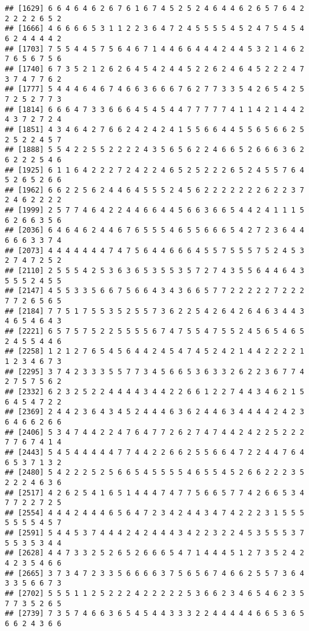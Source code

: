 \documentclass[
]{article}
\begin{document}
\begin{verbatim}
## [1629] 6 6 4 6 4 6 2 6 7 6 1 6 7 4 5 2 5 2 4 6 4 4 6 2 6 5 7 6 4 2 2 2 2 2 6 5 2
## [1666] 4 6 6 6 6 5 3 1 1 2 2 3 6 4 7 2 4 5 5 5 5 4 5 2 4 7 5 4 5 4 6 2 4 4 4 4 2
## [1703] 7 5 5 4 4 5 7 5 6 4 6 7 1 4 4 6 6 4 4 4 2 4 4 5 3 2 1 4 6 2 7 6 5 6 7 5 6
## [1740] 6 7 3 5 2 1 2 6 2 6 4 5 4 2 4 4 5 2 2 6 2 4 6 4 5 2 2 2 4 7 3 7 4 7 7 6 2
## [1777] 5 4 4 4 6 4 6 7 4 6 6 3 6 6 6 7 6 2 7 7 3 3 5 4 2 6 5 4 2 5 7 2 5 2 7 7 3
## [1814] 6 6 6 4 7 3 3 6 6 6 4 5 4 5 4 4 7 7 7 7 7 4 1 1 4 2 1 4 4 2 4 3 7 2 7 2 4
## [1851] 4 3 4 6 4 2 7 6 6 2 4 2 4 2 4 1 5 5 6 6 4 4 5 5 6 5 6 6 2 5 2 5 2 2 4 5 7
## [1888] 5 5 4 2 2 5 5 2 2 2 2 4 3 5 6 5 6 2 2 4 6 6 5 2 6 6 6 3 6 2 6 2 2 2 5 4 6
## [1925] 6 1 1 6 4 2 2 2 7 2 4 2 2 4 6 5 2 5 2 2 2 6 5 2 4 5 5 7 6 4 5 2 6 5 2 6 6
## [1962] 6 6 2 2 5 6 2 4 4 6 4 5 5 5 2 4 5 6 2 2 2 2 2 2 2 6 2 2 3 7 2 4 6 2 2 2 2
## [1999] 2 5 7 7 4 6 4 2 2 4 4 6 6 4 4 5 6 6 3 6 6 5 4 4 2 4 1 1 1 5 6 2 6 6 3 5 6
## [2036] 6 4 6 4 6 2 4 4 6 7 6 5 5 5 4 6 5 5 6 6 6 5 4 2 7 2 3 6 4 4 6 6 6 3 3 7 4
## [2073] 4 4 4 4 4 4 4 7 4 7 5 6 4 4 6 6 6 4 5 5 7 5 5 5 7 5 2 4 5 3 2 7 4 7 2 5 2
## [2110] 2 5 5 5 4 2 5 3 6 3 6 5 3 5 5 3 5 7 2 7 4 3 5 5 6 4 4 6 4 3 5 5 5 2 4 5 5
## [2147] 4 5 5 3 3 5 6 6 7 5 6 6 4 3 4 3 6 6 5 7 7 2 2 2 2 2 7 2 2 2 7 7 2 6 5 6 5
## [2184] 7 7 5 1 7 5 5 3 5 2 5 5 7 3 6 2 2 5 4 2 6 4 2 6 4 6 3 4 4 3 4 6 5 4 6 4 3
## [2221] 6 5 7 5 7 5 2 2 5 5 5 5 6 7 4 7 5 5 4 7 5 5 2 4 5 6 5 4 6 5 2 4 5 5 4 4 6
## [2258] 1 2 1 2 7 6 5 4 5 6 4 4 2 4 5 4 7 4 5 2 4 2 1 4 4 2 2 2 2 1 1 2 3 4 6 7 3
## [2295] 3 7 4 2 3 3 3 5 5 7 7 3 4 5 6 6 5 3 6 3 3 2 6 2 2 3 6 7 7 4 2 7 5 7 5 6 2
## [2332] 6 2 3 2 5 2 2 4 4 4 4 3 4 4 2 2 6 6 1 2 2 7 4 4 3 4 6 2 1 5 6 4 5 4 7 2 2
## [2369] 2 4 4 2 3 6 4 3 4 5 2 4 4 4 6 3 6 2 4 4 6 3 4 4 4 4 2 4 2 3 6 4 6 6 2 6 6
## [2406] 5 3 4 7 4 4 2 2 4 7 6 4 7 7 2 6 2 7 4 7 4 4 2 4 2 2 5 2 2 2 7 7 6 7 4 1 4
## [2443] 5 4 5 4 4 4 4 4 7 7 4 4 2 2 6 6 2 5 5 6 6 4 7 2 2 4 4 7 6 4 6 5 3 7 1 3 2
## [2480] 5 4 2 2 2 5 2 5 6 6 5 4 5 5 5 5 4 6 5 5 4 5 2 6 6 2 2 2 3 5 2 2 2 4 6 3 6
## [2517] 4 2 6 2 5 4 1 6 5 1 4 4 4 7 4 7 7 5 6 6 5 7 7 4 2 6 6 5 3 4 7 7 2 2 7 2 5
## [2554] 4 4 4 2 4 4 4 6 5 6 4 7 2 3 4 2 4 4 3 4 7 4 2 2 2 3 1 5 5 5 5 5 5 5 4 5 7
## [2591] 5 4 4 5 3 7 4 4 4 2 4 2 4 4 4 3 4 2 2 3 2 2 4 5 3 5 5 5 3 7 5 5 3 5 3 4 4
## [2628] 4 4 7 3 3 2 5 2 6 5 2 6 6 6 5 4 7 1 4 4 4 5 1 2 7 3 5 2 4 2 4 2 3 5 4 6 6
## [2665] 3 7 3 4 7 2 3 3 5 6 6 6 6 3 7 5 6 5 6 7 4 6 6 2 5 5 7 3 6 4 3 3 5 6 6 7 3
## [2702] 5 5 5 1 1 2 5 2 2 2 4 2 2 2 2 2 5 3 6 6 2 3 4 6 5 4 6 2 3 5 7 7 3 5 2 6 5
## [2739] 7 3 5 7 4 6 6 3 6 5 4 5 4 4 3 3 3 2 2 4 4 4 4 4 6 6 5 3 6 5 6 6 2 4 3 6 6

\end{verbatim}
\end{document}
